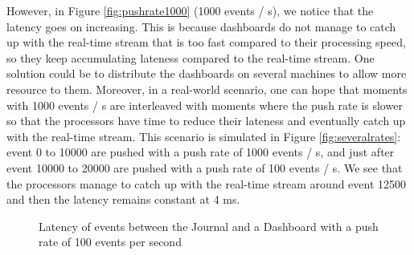 However, in Figure \ref{fig:pushrate1000} (1000 events / s), we notice that the latency goes on increasing. This is because dashboards do not manage to catch up with the real-time stream that is too fast compared to their processing speed, so they keep accumulating lateness compared to the real-time stream. One solution could be to distribute the dashboards on several machines to allow more resource to them. Moreover, in a real-world scenario, one can hope that moments with 1000 events / s are interleaved with moments where the push rate is slower so that the processors have time to reduce their lateness and eventually catch up with the real-time stream. This scenario is simulated in Figure \ref{fig:severalrates}: event 0 to 10000 are pushed with a push rate of 1000 events / s, and just after event 10000 to 20000 are pushed with a push rate of 100 events / s. We see that the processors manage to catch up with the real-time stream around event 12500 and then the latency remains constant at 4 ms.
\\

\begin{figure}
  \begin{center} 
    \caption{Latency of events between the Journal and a Dashboard with a push rate of 100 events per second}
    \label{fig:pushrate100}
  \end{center}
\end{figure}

